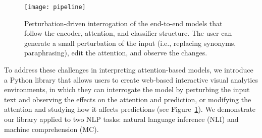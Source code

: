 \begin{figure}[htbp]
\centering
\vspace{-2mm}
 \texttt{[image: pipeline]}
 \vspace{-3mm}
 \caption{
 Perturbation-driven interrogation of the end-to-end models that follow the encoder, attention, and classifier structure. The user can generate a small perturbation of the input (i.e., replacing synonyms, paraphrasing), edit the attention, and observe the changes.
 }
 \vspace{-3mm}
\label{fig:modelPipeline}
\end{figure}


To address these challenges in interpreting attention-based models, 
we introduce a Python library that allows users to create web-based interactive visual analytics environments,
in which they can interrogate the model by perturbing the input text and observing the effects on the attention and prediction, or modifying the attention and studying how it affects predictions (see Figure~\ref{fig:modelPipeline}).
%
We demonstrate our library applied to two NLP tasks: natural language
inference (NLI) and machine comprehension (MC). 




